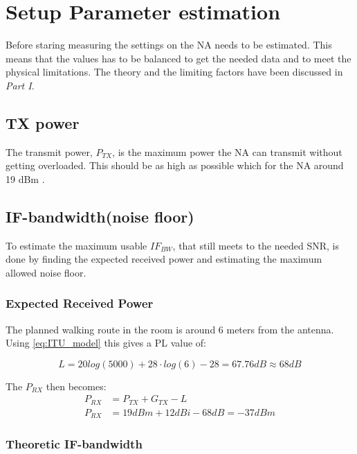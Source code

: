 

\chapter{Setup Parameter estimation}\label{sec:setup_parameter}
Before staring measuring the settings on the NA needs to be estimated. This means that the values has to be balanced to get the needed data and to meet the physical limitations. The theory and the limiting factors have been discussed in \textit{Part I}.


\section{TX power}
The transmit power, $P_{TX}$, is the maximum power the NA can transmit without getting overloaded. This should be as high as possible which for the NA  around 19 dBm \citep{Key_PNA}.

\section{IF-bandwidth(noise floor)}
To estimate the maximum usable $IF_{BW}$, that still meets to the needed SNR, is done by finding the expected received power and estimating the maximum allowed noise floor.  

\subsection{Expected Received Power}
The planned walking route in the room is around 6 meters from the antenna. Using \autoref{eq:ITU_model} this gives a \gls{PL} value of:

\begin{equation}
L = 20log (5000) + 28 \cdot log(6)-28 = 67.76dB \approx 68dB
\label{eq:path_loss}
\end{equation}

The $P_{RX}$ then becomes:
\begin{align}
P_{RX} &= P_{TX} + G_{TX} - L \\
P_{RX} &= 19dBm + 12dBi - 68dB = -37dBm
\label{NFvna}
\end{align}
\begin{where}
\end{where}


\subsection{Theoretic IF-bandwidth}

